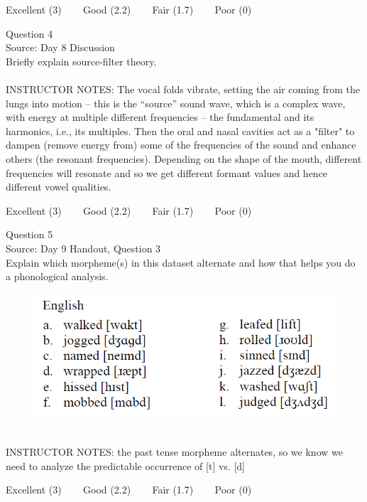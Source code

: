 \documentclass[12pt]{article}
\begin{document}
\vfill
Excellent (3) ~~~ Good (2.2) ~~~ Fair (1.7) ~~~ Poor (0)
\newpage

{\large Question 4}\\

Source: Day 8 Discussion\\

Briefly explain source-filter theory.\\


~\\
INSTRUCTOR NOTES: The vocal folds vibrate, setting the air coming from the lungs into motion -- this is the ``source'' sound wave, which is a complex wave, with energy at multiple different frequencies – the fundamental and its harmonics, i.e., its multiples. Then the oral and nasal cavities act as a "filter" to dampen (remove energy from) some of the frequencies of the sound and enhance others (the resonant frequencies). Depending on the shape of the mouth, different frequencies will resonate and so we get different formant values and hence different vowel qualities.


\vfill
Excellent (3) ~~~ Good (2.2) ~~~ Fair (1.7) ~~~ Poor (0)
\newpage

{\large Question 5}\\

Source: Day 9 Handout, Question 3\\

Explain which morpheme(s) in this dataset alternate and how that helps you do a phonological analysis.\\

\begin{figure}[H]
\includegraphics{../images/english_past.png}
\end{figure}

~\\
INSTRUCTOR NOTES: the past tense morpheme alternates, so we know we need to analyze the predictable occurrence of [t] vs. [d]


\vfill
Excellent (3) ~~~ Good (2.2) ~~~ Fair (1.7) ~~~ Poor (0)
\newpage
\end{document}
